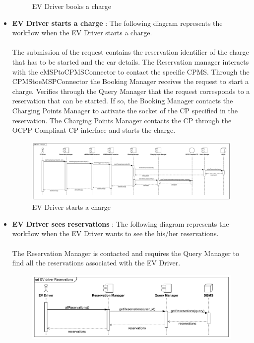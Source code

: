 \begin{itemize}
\begin{figure}[H]
        \caption{EV Driver books a charge}
    \end{figure}
    \pagebreak
    \item \textbf{EV Driver starts a charge} : The following diagram represents the workflow when the EV Driver starts a charge.\\
    \\The submission of the request contains the reservation identifier of the charge that has to be started and the car details.
    The Reservation manager interacts with the eMSPtoCPMSConnector to contact the specific CPMS. Through the CPMStoeMSPConnector the 
    Booking Manager receives the request to start a charge. Verifies through the Query Manager that the request corresponds to a reservation
    that can be started. If so, the Booking Manager contacts the Charging Points Manager to activate the socket of the CP specified in the reservation.
    The Charging Points Manager contacts the CP through the OCPP Compliant CP interface and starts the charge. 
    \begin{figure}[H]
        \centering
        \hspace*{-2cm}
        \includegraphics[scale=0.50]{src/runtimeVIew/eMSP_StartACharge.pdf}
        \caption{EV Driver starts a charge}
    \end{figure}
    \item \textbf{EV Driver sees reservations} : The following diagram represents the workflow when the EV Driver wants to see the his/her reservations.\\
    \\ The Reservation Manager is contacted and requires the Query Manager to find all the reservations associated with the EV Driver.
    \begin{figure}[H]
        \centering
        \includegraphics[scale=0.55]{src/runtimeVIew/eMSP_Reservations.pdf}

\end{figure}
\end{itemize}
